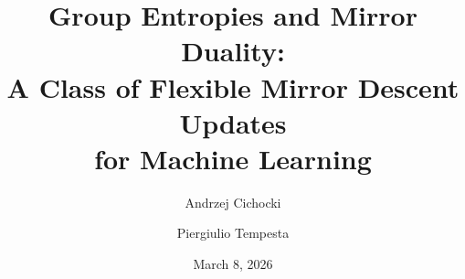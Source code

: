 \documentclass[10pt]{amsart}
\theoremstyle{definition}
\theoremstyle{definition}	 %
\begin{document}
\title[Group Entropies  and Mirror Duality]{Group Entropies  and Mirror Duality:\\
A  Class of Flexible  Mirror Descent Updates \\ for Machine Learning}

\author{Andrzej Cichocki} 
\address{Systems Research Institute of Polish Academy of Science\\
      Newelska 8, 01-447 Warszawa, Poland, \\ Warsaw University of Technology \\ Koszykowa 75, 00-662 Warszawa, Poland}
   
\author{Piergiulio Tempesta}
\address{Departamento de F\'{\i}sica Te\'{o}rica, Facultad de Ciencias F\'{\i}sicas \\
  Universidad Complutense de Madrid, 28040 -- Madrid, Spain \\ and Instituto de Ciencias
  Matem\'aticas \\ C/ Nicol\'as Cabrera, No 13--15, 28049 Madrid, Spain}






\date{March 8, 2026}

\maketitle
\end{document}
